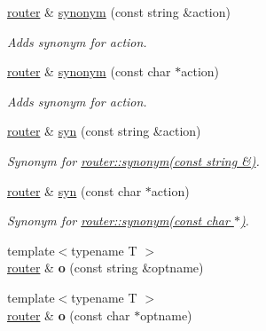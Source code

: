 \begin{DoxyCompactItemize}
\item 
\hyperlink{classpfs_1_1cli_1_1router}{router} \& \hyperlink{classpfs_1_1cli_1_1router_aaadb7eb9699252dce1931a47d2b7a9c0}{synonym} (const string \&action)
\begin{DoxyCompactList}\small\item\em Adds synonym for action. \end{DoxyCompactList}\item 
\hyperlink{classpfs_1_1cli_1_1router}{router} \& \hyperlink{classpfs_1_1cli_1_1router_acc6fda315239e045e0c6e89e84e6825f}{synonym} (const char $\ast$action)
\begin{DoxyCompactList}\small\item\em Adds synonym for action. \end{DoxyCompactList}\item 
\hyperlink{classpfs_1_1cli_1_1router}{router} \& \hyperlink{classpfs_1_1cli_1_1router_a1027fac170cec9c7da63b1d028808d81}{syn} (const string \&action)
\begin{DoxyCompactList}\small\item\em Synonym for \hyperlink{classpfs_1_1cli_1_1router_aaadb7eb9699252dce1931a47d2b7a9c0}{router\-::synonym(const string \&)}. \end{DoxyCompactList}\item 
\hyperlink{classpfs_1_1cli_1_1router}{router} \& \hyperlink{classpfs_1_1cli_1_1router_ae1921490fb0b97fb4ab0100ae9ef4358}{syn} (const char $\ast$action)
\begin{DoxyCompactList}\small\item\em Synonym for \hyperlink{classpfs_1_1cli_1_1router_acc6fda315239e045e0c6e89e84e6825f}{router\-::synonym(const char $\ast$)}. \end{DoxyCompactList}\item 
\hypertarget{classpfs_1_1cli_1_1router_a27ea658d72099ab0bacc16e70d872fca}{{\footnotesize template$<$typename T $>$ }\\\hyperlink{classpfs_1_1cli_1_1router}{router} \& {\bfseries o} (const string \&optname)}\label{classpfs_1_1cli_1_1router_a27ea658d72099ab0bacc16e70d872fca}

\item 
\hypertarget{classpfs_1_1cli_1_1router_a9217b29a68a1102bf18e2a95e13d6fd6}{{\footnotesize template$<$typename T $>$ }\\\hyperlink{classpfs_1_1cli_1_1router}{router} \& {\bfseries o} (const char $\ast$optname)}\label{classpfs_1_1cli_1_1router_a9217b29a68a1102bf18e2a95e13d6fd6}


\end{DoxyCompactItemize}
